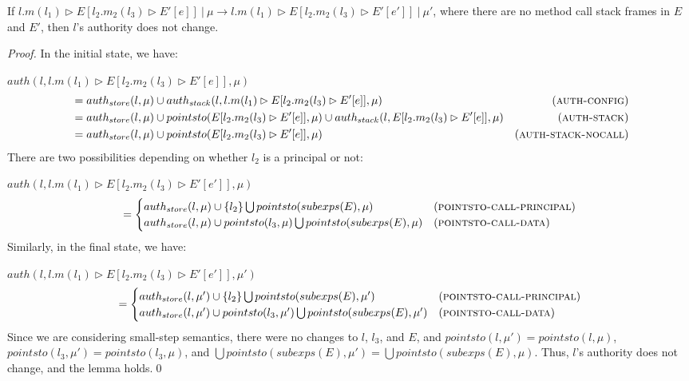 \documentclass{llncs}
\begin{document}
\newpage
\begin{lemma}
If 
\mbox{$l.m(l_1) \rhd E[l_2.m_2(l_3) \rhd E'[e]]~|~\mu \longrightarrow l.m(l_1) \rhd E[l_2.m_2(l_3) \rhd E'[e']]~|~\mu'$}, where there are no method call stack frames in $E$ and $E'$, then $l$'s authority does not change.
\end{lemma}

\begin{proof} In the initial state, we have:

\noindent$auth(l, l.m(l_1) \rhd E[l_2.m_2(l_3) \rhd E'[e]], \mu)$
\vspace{-7pt}
\begin{align*}
&= auth_{store}(l, \mu) \cup auth_{stack}(l, l.m(l_1) \rhd E[l_2.m_2(l_3) \rhd E'[e]], \mu) & (\textsc{auth-config})\\
&= auth_{store}(l, \mu) \cup pointsto(E[l_2.m_2(l_3) \rhd E'[e]], \mu) \cup auth_{stack}(l, E[l_2.m_2(l_3) \rhd E'[e]], \mu) & (\textsc{auth-stack})\\
&= auth_{store}(l, \mu) \cup pointsto(E[l_2.m_2(l_3) \rhd E'[e]], \mu) & (\textsc{auth-stack-nocall})
\end{align*}
There are two possibilities depending on whether $l_2$ is a principal or not:

\noindent$auth(l, l.m(l_1) \rhd E[l_2.m_2(l_3) \rhd E'[e']], \mu)$
\vspace{-7pt}
\[
= 
\begin{cases}
    auth_{store}(l, \mu) \cup \{ l_2 \} \bigcup pointsto(subexps(E), \mu) & (\textsc{pointsto-call-principal})\\
    auth_{store}(l, \mu) \cup pointsto(l_3, \mu) \bigcup pointsto(subexps(E), \mu) & (\textsc{pointsto-call-data})
\end{cases}
\]Similarly, in the final state, we have:

\noindent$auth(l, l.m(l_1) \rhd E[l_2.m_2(l_3) \rhd E'[e']], \mu')$
\vspace{-7pt}
\[
= 
\begin{cases}
    auth_{store}(l, \mu') \cup \{ l_2 \} \bigcup pointsto(subexps(E), \mu') & (\textsc{pointsto-call-principal})\\
    auth_{store}(l, \mu') \cup pointsto(l_3, \mu') \bigcup pointsto(subexps(E), \mu') & (\textsc{pointsto-call-data})
\end{cases}
\]
Since we are considering small-step semantics, there were no changes to $l$, $l_3$, and $E$, and $pointsto(l, \mu') = pointsto(l, \mu)$, $pointsto(l_3, \mu') = pointsto(l_3, \mu)$, and $\bigcup pointsto(subexps(E), \mu') = \bigcup pointsto(subexps(E), \mu)$. Thus, $l$'s authority does not change, and the lemma holds.\qed

\end{proof}
\end{document}
